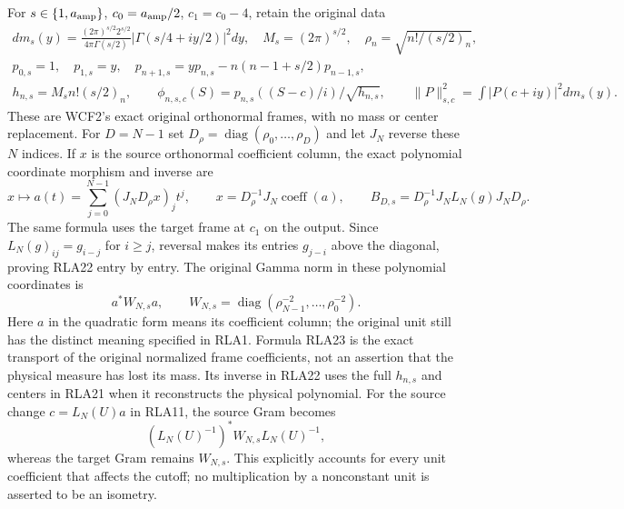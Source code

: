 \documentclass[11pt]{article}
\begin{document}
For $s\in\{1,a_{\rm amp}\}$, $c_0=a_{\rm amp}/2$, $c_1=c_0-4$,
retain the original data
\[
\begin{gathered}
 dm_s(y)=\frac{(2\pi)^{s/2}2^{s/2}}{4\pi\Gamma(s/2)}
       |\Gamma(s/4+iy/2)|^2dy,\quad M_s=(2\pi)^{s/2},\quad
 \rho_n=\sqrt{n!/(s/2)_n},\\
 p_{0,s}=1,\quad p_{1,s}=y,\quad
 p_{n+1,s}=yp_{n,s}-n(n-1+s/2)p_{n-1,s},\\
 h_{n,s}=M_sn!(s/2)_n,\qquad
 \phi_{n,s,c}(S)=p_{n,s}((S-c)/i)/\sqrt{h_{n,s}},\qquad
 \|P\|_{s,c}^2=\int|P(c+iy)|^2dm_s(y).
\end{gathered}\tag{RLA21}
\]
These are WCF2's exact original orthonormal frames, with no mass
or center replacement.  For $D=N-1$ set $D_\rho=\operatorname{diag}
(\rho_0,\ldots,\rho_D)$ and let $J_N$ reverse these $N$ indices.
If $x$ is the source orthonormal coefficient column, the exact
polynomial coordinate morphism and inverse are
\[
 x\longmapsto a(t)=\sum_{j=0}^{N-1}(J_ND_\rho x)_jt^j,
 \qquad x=D_\rho^{-1}J_N\operatorname{coeff}(a),\qquad
 B_{D,s}=D_\rho^{-1}J_NL_N(g)J_ND_\rho.
 \tag{RLA22}
\]
The same formula uses the target frame at $c_1$ on the output.
Since $L_N(g)_{ij}=g_{i-j}$ for $i\ge j$, reversal makes its
entries $g_{j-i}$ above the diagonal, proving RLA22 entry by entry.
The original Gamma norm in these polynomial coordinates is
\[
 a^*W_{N,s}a,\qquad
 W_{N,s}=\operatorname{diag}(\rho_{N-1}^{-2},\ldots,\rho_0^{-2}).
 \tag{RLA23}
\]
Here $a$ in the quadratic form means its coefficient column;
the original unit still has the distinct meaning specified in RLA1.
Formula RLA23 is the exact transport of the original normalized
frame coefficients, not an assertion that the physical measure
has lost its mass.  Its inverse in RLA22 uses the full $h_{n,s}$
and centers in RLA21 when it reconstructs the physical polynomial.
For the source change $c=L_N(U)a$ in RLA11, the source Gram becomes
\[
 (L_N(U)^{-1})^*W_{N,s}L_N(U)^{-1},
 \tag{RLA24}
\]
whereas the target Gram remains $W_{N,s}$.
This explicitly accounts for every unit coefficient that affects
the cutoff; no multiplication by a nonconstant unit is asserted
to be an isometry.
\end{document}
